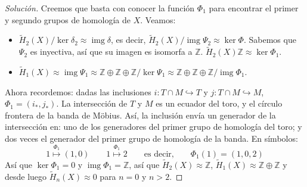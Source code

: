 \documentclass[spanish]{book}
\theoremstyle{definition}
\newcommand{\Z}{\mathbb{Z}}
\DeclareMathOperator{\img}{img}
\begin{document}
\begin{proof}[Solución]
	Creemos que basta con conocer la función $\Phi_1$ para encontrar el primer y segundo grupos de homología de $X$. Veamos:
	\begin{itemize}
		\item $\tilde{H}_2(X)/\ker\delta_2\approx\img\delta$, es decir, $\tilde{H}_2(X)/\img\Psi_2\approx\ker\Phi$. Sabemos que $\Psi_2$ es inyectiva, así que su imagen es isomorfa a $\Z$. $\tilde{H}_2(X)\Z\approx\ker\Phi_1$.
		\item $\tilde{H}_1(X)\approx\img\Psi_1\approx\Z\oplus\Z\oplus\Z/\ker\Psi_1\approx\Z\oplus\Z\oplus\Z/\img\Phi_1$.
	\end{itemize}
	Ahora recordemos: dadas las inclusiones $i:T\cap M\hookrightarrow T$ y $j:T\cap M\hookrightarrow M$, $\Phi_1=(i_*,j_*)$. La intersección de $T$ y $M$ es un ecuador del toro, y el círculo frontera de la banda de Möbius. Así, la inclusión envía un generador de la intersección en: uno de los generadores del primer grupo de homología del toro; y dos veces el generador del primer grupo de homología de la banda. En símbolos:
	\[1\overset{\Phi_1}{\mapsto}(1,0)\qquad1\overset{\Phi_1}{\mapsto}2\qquad\text{es decir,}\qquad\Phi_1(1)=(1,0,2)\]
	Así que $\ker\Phi_1=0$ y $\img\Phi_1=\Z$, así que $\tilde{H}_2(X)\approx\Z$, $\tilde{H}_1(X)\approx\Z\oplus\Z$ y desde luego $\tilde{H}_n(X)\approx0$ para $n=0$ y $n>2$.
	
	\end{proof}
	
\end{document}
